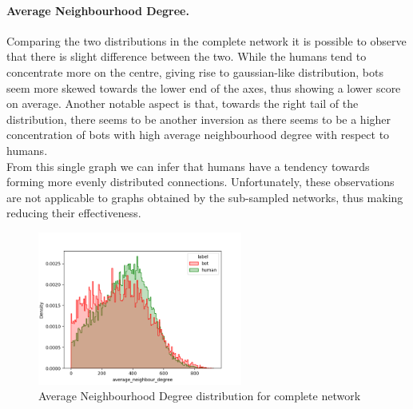 \documentclass[12pt, a4paper]{article}
\begin{document}
		\paragraph{Average Neighbourhood Degree.} Comparing the two distributions in the complete network it is possible to observe that there is slight difference between the two. While the humans tend to concentrate more on the centre, giving rise to gaussian-like distribution, bots seem more skewed towards the lower end of the axes, thus showing a lower score on average. Another notable aspect is that, towards the right tail of the distribution, there seems to be another inversion as there seems to be a higher concentration of bots with high average neighbourhood degree with respect to humans.\\
		From this single graph we can infer that humans have a tendency towards forming more evenly distributed connections. Unfortunately, these  observations are not applicable to graphs obtained by the sub-sampled networks, thus making reducing their effectiveness.
		\begin{figure}[H]
			\centering
            \includegraphics[width=0.6\textwidth]{results/complete_average_neighbour_degree.png}
            \caption{Average Neighbourhood Degree distribution for complete network}
        \end{figure}
\end{document}
